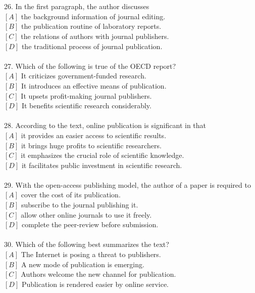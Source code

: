 \documentclass[a4paper]{ctexart}
\begin{document}
\\
\\
26.	In the first paragraph, the author discusses\\
$[A]$ the background information of journal editing.\\
$[B]$ the publication routine of laboratory reports.\\
$[C]$ the relations of authors with journal publishers.\\
$[D]$ the traditional process of journal publication.\\
\\
27.	Which of the following is true of the OECD report?\\
$[A]$ It criticizes government-funded research.\\
$[B]$ It introduces an effective means of publication.\\
$[C]$ It upsets profit-making journal publishers.\\
$[D]$ It benefits scientific research considerably.\\
\\
28.	According to the text, online publication is significant in that\\
$[A]$ it provides an easier access to scientific results.\\
$[B]$ it brings huge profits to scientific researchers.\\
$[C]$ it emphasizes the crucial role of scientific knowledge.\\
$[D]$ it facilitates public investment in scientific research.\\
\\
29.	With the open-access publishing model, the author of a paper is required to\\
$[A]$ cover the cost of its publication.\\
$[B]$ subscribe to the journal publishing it.\\
$[C]$ allow other online journals to use it freely.\\
$[D]$ complete the peer-review before submission.\\
\\
30.	Which of the following best summarizes the text?\\
$[A]$ The Internet is posing a threat to publishers.\\
$[B]$ A new mode of publication is emerging.\\
$[C]$ Authors welcome the new channel for publication.\\
$[D]$ Publication is rendered easier by online service.\\
\end{document}
